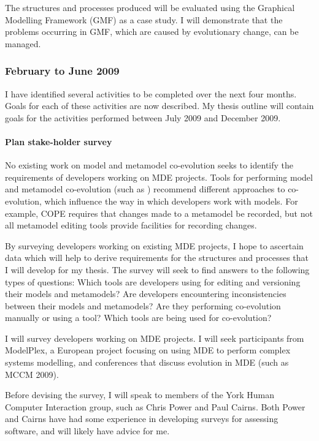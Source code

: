 
The structures and processes produced will be evaluated using the Graphical Modelling Framework (GMF) \cite{gronback06gmf} as a case study. I will demonstrate that the problems occurring in GMF, which are caused by evolutionary change, can be managed.

\subsubsection{February to June 2009}
I have identified several activities to be completed over the next four months. Goals for each of these activities are now described. My thesis outline will contain goals for the activities performed between July 2009 and December 2009.

\paragraph{Plan stake-holder survey} %
\label{par:plan_stakeholder_survey}
No existing work on model and metamodel co-evolution seeks to identify the requirements of developers working on MDE projects. Tools for performing model and metamodel co-evolution (such as \cite{herrmannsdoerfer08cope,cicchetti08automating}) recommend different approaches to co-evolution, which influence the way in which developers work with models. For example, COPE \cite{herrmannsdoerfer08cope} requires that changes made to a metamodel be recorded, but not all metamodel editing tools provide facilities for recording changes.

By surveying developers working on existing MDE projects, I hope to ascertain data which will help to derive requirements for the structures and processes that I will develop for my thesis. The survey will seek to find answers to the following types of questions: Which tools are developers using for editing and versioning their models and metamodels? Are developers encountering inconsistencies between their models and metamodels? Are they performing co-evolution manually or using a tool? Which tools are being used for co-evolution?

I will survey developers working on MDE projects. I will seek participants from ModelPlex, a European project focusing on using MDE to perform complex systems modelling, and conferences that discuss evolution in MDE (such as MCCM 2009). 

Before devising the survey, I will speak to members of the York Human Computer Interaction group, such as Chris Power and Paul Cairns. Both Power and Cairns have had some experience in developing surveys for assessing software, and will likely have advice for me.

